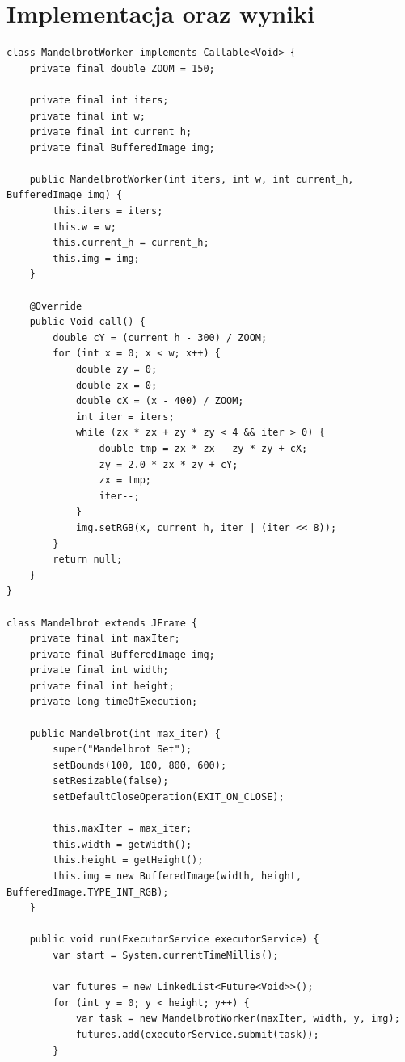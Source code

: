 \documentclass[12pt]{article}
\begin{document}
\section{Implementacja oraz wyniki}

\begin{verbatim}
class MandelbrotWorker implements Callable<Void> {
    private final double ZOOM = 150;

    private final int iters;
    private final int w;
    private final int current_h;
    private final BufferedImage img;

    public MandelbrotWorker(int iters, int w, int current_h, BufferedImage img) {
        this.iters = iters;
        this.w = w;
        this.current_h = current_h;
        this.img = img;
    }

    @Override
    public Void call() {
        double cY = (current_h - 300) / ZOOM;
        for (int x = 0; x < w; x++) {
            double zy = 0;
            double zx = 0;
            double cX = (x - 400) / ZOOM;
            int iter = iters;
            while (zx * zx + zy * zy < 4 && iter > 0) {
                double tmp = zx * zx - zy * zy + cX;
                zy = 2.0 * zx * zy + cY;
                zx = tmp;
                iter--;
            }
            img.setRGB(x, current_h, iter | (iter << 8));
        }
        return null;
    }
}

class Mandelbrot extends JFrame {
    private final int maxIter;
    private final BufferedImage img;
    private final int width;
    private final int height;
    private long timeOfExecution;

    public Mandelbrot(int max_iter) {
        super("Mandelbrot Set");
        setBounds(100, 100, 800, 600);
        setResizable(false);
        setDefaultCloseOperation(EXIT_ON_CLOSE);

        this.maxIter = max_iter;
        this.width = getWidth();
        this.height = getHeight();
        this.img = new BufferedImage(width, height, BufferedImage.TYPE_INT_RGB);
    }

    public void run(ExecutorService executorService) {
        var start = System.currentTimeMillis();

        var futures = new LinkedList<Future<Void>>();
        for (int y = 0; y < height; y++) {
            var task = new MandelbrotWorker(maxIter, width, y, img);
            futures.add(executorService.submit(task));
        }


\end{verbatim}
\end{document}
